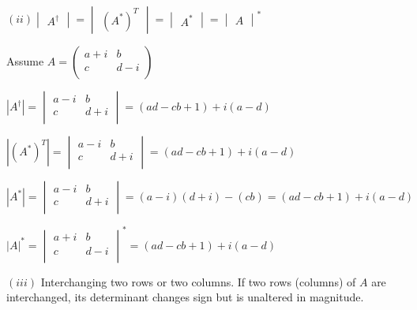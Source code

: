 \documentclass[fleqn]{article}
\begin{document}
\begin{enumerate}
    \bigbreak

    $
    (ii) \begin{vmatrix}
      A^{\dagger}
    \end{vmatrix}=\begin{vmatrix}
      (A^*)^T
    \end{vmatrix}=\begin{vmatrix}
      A^*
    \end{vmatrix}=\begin{vmatrix}
      A
    \end{vmatrix}^*
    $

    \textcolor{hwColor}{
      Assume
      $
        A=\begin{pmatrix}
          a+i & b \\
          c & d-i \\
        \end{pmatrix}
      $
    }

    \textcolor{hwColor}{
      $
        |A^\dagger|=\begin{vmatrix}
          a-i & b \\
          c & d+i \\
        \end{vmatrix}=(ad-cb+1)+i(a-d)
      $
    }

    \textcolor{hwColor}{
      $
        |(A^*)^T|=\begin{vmatrix}
          a-i & b \\
          c & d+i \\
        \end{vmatrix}=(ad-cb+1)+i(a-d)
      $
    }

    \textcolor{hwColor}{
      $
        |A^*|=\begin{vmatrix}
          a-i & b \\
          c & d+i \\
        \end{vmatrix}=(a-i)(d+i)-(cb)=(ad-cb+1)+i(a-d)
      $
    }

    \textcolor{hwColor}{
      $
      |A|^*=\begin{vmatrix}
        a+i & b \\
        c & d-i \\
      \end{vmatrix}^*=(ad-cb+1)+i(a-d)
      $
    }

    \bigbreak

    $(iii)$ Interchanging two rows or two columns. If two rows (columns) of $A$ are interchanged, its determinant changes sign but is unaltered in magnitude.


\end{enumerate}
\end{document}
